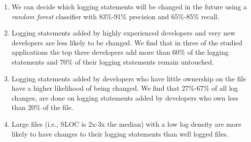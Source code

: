 \begin{enumerate}
	\item We can decide which logging statements will be changed in the future using a \emph{random forest} classifier with 83\%-91\% precision and 65\%-85\% recall.


	\item Logging statements added  by highly experienced developers and very new developers are less likely to be changed. We find that in three of the studied applications the top three developers add more than 60\% of the logging statements and 70\% of their logging statements remain untouched. 
	
	

	\item Logging statements added by developers who have little ownership on the file have a higher likelihood of being changed. We find that 27\%-67\% of all log changes, are done on logging statements added by developers who own less than 20\% of the file.
 
	
	
	
	\item Large files (i.e., SLOC is 2x-3x the median) with a low log density are more likely to have changes to their logging statements than well logged files.


\end{enumerate}

